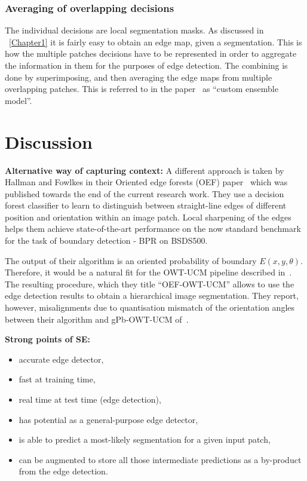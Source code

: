 \subsubsection*{Averaging of overlapping decisions}
The individual decisions are local segmentation masks. As discussed in \textsection~\ref{Chapter1} it is fairly easy to obtain an edge map, given a segmentation. This is how the multiple patches decisions have to be represented in order to aggregate the information in them for the purposes of edge detection. The combining is done by superimposing, %
and then averaging the edge maps from multiple overlapping patches. %
This is referred to in the paper~\cite{DollarICCV13edges} as ``custom ensemble model''.

\section{Discussion}
\textbf{Alternative way of capturing context:} A different approach is taken by Hallman and Fowlkes in their Oriented edge forests (OEF) paper~\cite{Hallman2014} which was published towards the end of the current research work. They use a decision forest classifier to learn to distinguish between straight-line edges of different position and orientation within an image patch. Local sharpening of the edges helps them achieve state-of-the-art performance on the now standard benchmark for the task of boundary detection - BPR on BSDS500.

The output of their algorithm is an oriented probability of boundary $E(x,y,\theta)$. Therefore, it would be a natural fit for the OWT-UCM pipeline described in~\cite{Arbelaez11}. The resulting procedure, which they title ``OEF-OWT-UCM'' allows to use the edge detection results to obtain a hierarchical image segmentation. They report, however, misalignments due to quantisation mismatch of the orientation angles between their algorithm and gPb-OWT-UCM of~\cite{Arbelaez11}.

\textbf{Strong points of SE:}

\begin{itemize}
 \item accurate edge detector,
 \item fast at training time,
 \item real time at test time (edge detection),
 \item has potential as a general-purpose edge detector, %
 \item is able to predict a most-likely segmentation for a given input patch,
 \item can be augmented to store all those intermediate predictions as a by-product from the edge detection.
\end{itemize}

